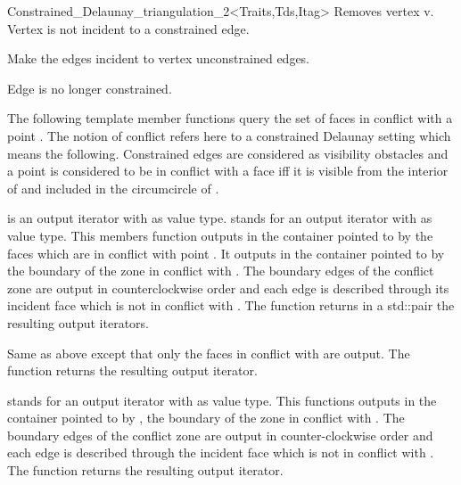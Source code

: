 \begin{ccRefClass}{Constrained_Delaunay_triangulation_2<Traits,Tds,Itag>}
{ Removes vertex v. 
\ccPrecond Vertex   is not incident to a constrained edge.}

{Make the edges incident to vertex  unconstrained edges.}

{ Edge   is no longer constrained.}


The following template member functions query the
set of faces in conflict with a point .
The notion of conflict refers here to a 
constrained Delaunay setting which means the following.
Constrained edges are considered as visibility obstacles
and a point  is considered to be 
in conflict with a face  iff it is 
 visible from the interior of  and 
included in the circumcircle of .

{  is an output iterator with  as value type.
 stands for an output iterator with  as value type.
This members function outputs in the container pointed to by 
the faces which are in conflict with point .
It outputs in the container pointed to by  
the boundary of the zone in conflict with .
The boundary edges
of the conflict  zone are output in counterclockwise order
and each edge is described  through its incident face
which is not in conflict with .
The function returns in a std::pair the resulting output iterators.
}

{Same as above except that only the faces in conflict with 
are output. The function returns the resulting output iterator.}

{  stands for an output iterator with 
 as value
type.
 This functions  outputs in the container pointed to by ,
the boundary of the zone in conflict with . The boundary edges
of the conflict  zone are output in counter-clockwise order
and each edge is described  through the incident face
which is not in conflict with .
The function returns the resulting output iterator.}



\end{ccRefClass}
